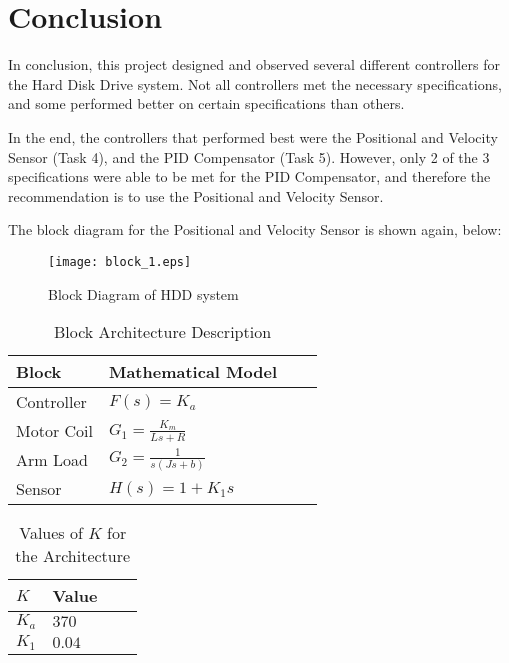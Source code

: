 \documentclass{article}
\begin{document}
\section*{Conclusion}

In conclusion, this project designed and observed several different controllers
for the Hard Disk Drive system. Not all controllers met the necessary
specifications, and some performed better on certain specifications than others.

In the end, the controllers that performed best were the Positional and Velocity
Sensor (Task 4), and the PID Compensator (Task 5). However, only 2 of the 3
specifications were able to be met for the PID Compensator, and therefore the
recommendation is to use the Positional and Velocity Sensor.

The block diagram for the Positional and Velocity Sensor is shown again, below:

\begin{figure}[H]
  \centering
  \caption{Block Diagram of HDD system}
  \texttt{[image: block\_1.eps]}
\end{figure}

\begin{table}[H]
  \begin{center}
    \begin{tabular}{ | l | l | l | p{5cm} |}
    \hline
    \textbf{Block} & \textbf{Mathematical Model} \\ \hline
    Controller & $F(s) = K_a$ \\ \hline 
    Motor Coil& $G_1 = \frac{K_m}{Ls + R}$ \\ \hline
    Arm Load & $G_2 =  \frac{1}{s(Js + b)}$ \\ \hline
    Sensor & $H(s) = 1 + K_1s$ \\ \hline
   \end{tabular}
 \end{center}
 \caption{Block Architecture Description}
\end{table}

\begin{table}[H]
  \begin{center}
    \begin{tabular}{ | l | l | l | p{5cm} |}
    \hline
    \textbf{$K$} & \textbf{Value} \\ \hline
    $K_a$ & $370$ \\ \hline
    $K_1$ & $0.04$ \\ \hline
   \end{tabular}
 \end{center}
 \caption{Values of $K$ for the Architecture}
\end{table}
\end{document}
